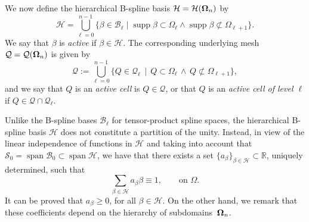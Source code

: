 \documentclass[12pt,a4paper,pdftex]{article}
\theoremstyle{plain}
\theoremstyle{definition}
\theoremstyle{remark}
\DeclareMathOperator{\supp}{supp}
\DeclareMathOperator{\Span}{span}
\newcommand\BB{\mathcal B}
\newcommand\QQ{\mathcal Q}
\newcommand\HH{\mathcal H}
\newcommand\VV{\mathcal S}
\newcommand\RRR{\mathcal R}
\newcommand{\RR}{\mathbb R}
\begin{document}
We now define the hierarchical B-spline basis ${\HH}= {\HH}({\bf\Omega}_n)$ by 
\begin{equation}\label{E:Hierarchical basis}
{\HH}= \bigcup_{\ell = 0}^{n-1} \{\beta \in \BB_\ell \mid \supp \beta 
\subset \Omega_\ell \wedge  \supp \beta \not\subset \Omega_{\ell+1}\}.
\end{equation} 
We say that $\beta$ is \emph{active} if $\beta\in\HH$. The 
corresponding underlying mesh $\QQ = \QQ({\bf\Omega}_n)$ is given 
by
\begin{equation}\label{E:hierarchical mesh}
\QQ:= \bigcup_{\ell = 0}^{n-1} \{ Q\in\QQ_\ell\,\mid\, Q\subset \Omega_\ell 
\,\wedge\, Q\not\subset \Omega_{\ell+1}\}, 
\end{equation}
and we say that $Q$ is an \emph{active cell} is $Q\in\QQ$, or that $Q$ is an 
\emph{active cell of level $\ell$} if $Q\in\QQ\cap \QQ_\ell$.


Unlike the B-spline bases $\BB_\ell$ for tensor-product spline spaces, the hierarchical B-spline basis $\HH$ does not constitute a partition of the unity. Instead, in view of the linear independence of functions in $\HH$ and taking into account that $\VV_0=\Span\BB_0\subset\Span\HH$, we have that there exists a set $\{a_\beta\}_{\beta\in\HH}\subset \RR$, uniquely determined, such that
 \begin{equation}\label{E:partition of the unity in the hierarchical space}
\sum_{\beta\in {\HH}} a_\beta \beta \equiv 1, \qquad\text{on } \Omega. 
\end{equation}
 It can be proved that $a_\beta\ge 0$, for all $\beta\in\HH$. On the other hand, we remark that these coefficients depend on the hierarchy of subdomains~${\bf\Omega}_n$.
\end{document}
